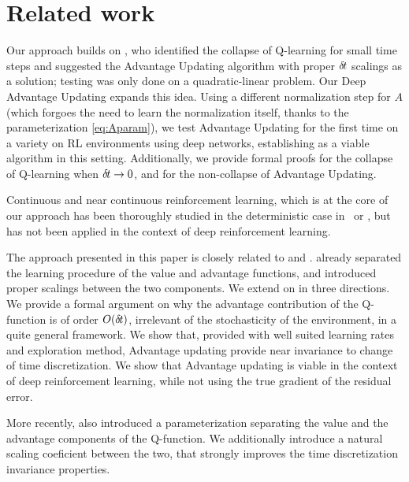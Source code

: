 \section{Related work}
\label{sec:related}

Our approach builds on \cite{adv_upd}, who identified the
collapse of Q-learning for small time steps and suggested the Advantage
Updating algorithm with proper ${\delta\hspace{-.1em}t}$ scalings as a solution; testing
was only done on a quadratic-linear problem. Our Deep Advantage Updating
expands this idea. Using a different normalization step for $A$ (which
forgoes the need to learn the normalization itself, thanks to the
parameterization \eqref{eq:Aparam}), we test Advantage Updating for the
first time on a variety on RL environments using deep networks,
establishing as a viable algorithm in this setting.
Additionally, we provide formal proofs for the collapse
of Q-learning when ${\delta\hspace{-.1em}t}\to 0$, and for the non-collapse of Advantage
Updating.


Continuous and near continuous reinforcement learning, which is at the core of
our approach has been thoroughly studied in the deterministic case
in~\cite{adv_upd} or \cite{cont_rl}, but has not been applied in the context of
deep reinforcement learning.

The approach presented in this paper is closely related to \cite{adv_upd} and
\cite{cont_rl}. \cite{adv_upd} already separated the learning procedure of the
value and advantage functions, and introduced proper scalings between the two
components. We extend on \cite{adv_upd} in three directions. We provide a
formal argument on why the advantage contribution of the Q-function is of order
$O({\delta\hspace{-.1em}t})$, irrelevant of the stochasticity of the environment, in a quite
general framework. We show that, provided with well suited learning rates and
exploration method, Advantage updating provide near invariance to change of time
discretization. We show that Advantage updating is viable in the context of deep
reinforcement learning, while not using the true gradient of the residual error.

More recently, \cite{dueling_nets} also introduced a parameterization separating
the value and the advantage components of the Q-function. We additionally
introduce a natural scaling coeficient between the two, that strongly improves
the time discretization invariance properties.

